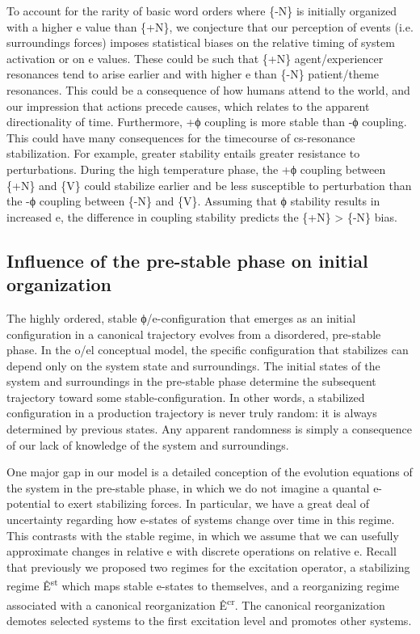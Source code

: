   To account for the rarity of basic word orders where \{-N\} is initially organized with a higher e value than \{+N\}, we conjecture that our perception of events (i.e. surroundings forces) imposes statistical biases on the relative timing of system activation or on e values. These could be such that \{+N\} agent/experiencer resonances tend to arise earlier and with higher e than \{-N\} patient/theme resonances. This could be a consequence of how humans attend to the world, and our impression that actions precede causes, which relates to the apparent directionality of time. Furthermore, +ϕ coupling is more stable than -ϕ coupling. This could have many consequences for the timecourse of cs-resonance stabilization. For example, greater stability entails greater resistance to perturbations. During the high temperature phase, the +ϕ coupling between \{+N\} and \{V\} could stabilize earlier and be less susceptible to perturbation than the -ϕ coupling between \{-N\} and \{V\}. Assuming that ϕ stability results in increased e, the difference in coupling stability predicts the \{+N\} > \{-N\} bias.

\subsection{Influence of the pre-stable phase on initial organization}

The highly ordered, stable ϕ/e-configuration that emerges as an initial configuration in a canonical trajectory evolves from a disordered, pre-stable phase. In the o/el conceptual model, the specific configuration that stabilizes can depend only on the system state and surroundings. The initial states of the system and surroundings in the pre-stable phase determine the subsequent trajectory toward some stable-configuration. In other words, a stabilized configuration in a production trajectory is never truly random: it is always determined by previous states. Any apparent randomness is simply a consequence of our lack of knowledge of the system and surroundings.

  One major gap in our model is a detailed conception of the evolution equations of the system in the pre-stable phase, in which we do not imagine a quantal e-potential to exert stabilizing forces. In particular, we have a great deal of uncertainty regarding how e-states of systems change over time in this regime. This contrasts with the stable regime, in which we assume that we can usefully approximate changes in relative e with discrete operations on relative e. Recall that previously we proposed two regimes for the excitation operator, a stabilizing regime Ê\textsuperscript{st} which maps stable e-states to themselves, and a reorganizing regime associated with a canonical reorganization Ê\textsuperscript{cr}. The canonical reorganization demotes selected systems to the first excitation level and promotes other systems. 

